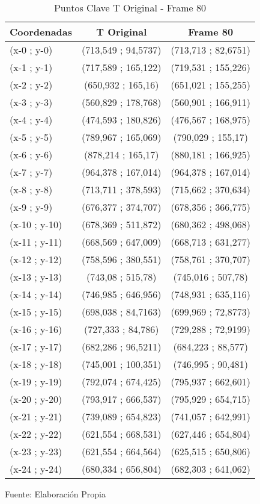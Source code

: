 \begin{table}[htbp]
	\centering
	\begin{tabular}{|l|c|c|}
		\hline
		Coordenadas & T Original & Frame 80\\ \hline 
		(x-0 ; y-0) & (713,549 ; 94,5737) & (713,713 ; 82,6751) \\
		(x-1 ; y-1) & (717,589 ; 165,122) & (719,531 ; 155,226) \\
		(x-2 ; y-2) & (650,932 ; 165,16) & (651,021 ; 155,255) \\
		(x-3 ; y-3) & (560,829 ; 178,768) & (560,901 ; 166,911) \\
		(x-4 ; y-4) & (474,593 ; 180,826) & (476,567 ; 168,975) \\
		(x-5 ; y-5) & (789,967 ; 165,069) & (790,029 ; 155,17) \\
		(x-6 ; y-6) & (878,214 ; 165,17) & (880,181 ; 166,925) \\
		(x-7 ; y-7) & (964,378 ; 167,014) & (964,378 ; 167,014) \\
		(x-8 ; y-8) & (713,711 ; 378,593) & (715,662 ; 370,634) \\
		(x-9 ; y-9) & (676,377 ; 374,707) & (678,356 ; 366,775) \\
		(x-10 ; y-10) & (678,369 ; 511,872) & (680,362 ; 498,068) \\
		(x-11 ; y-11) & (668,569 ; 647,009) & (668,713 ; 631,277) \\
		(x-12 ; y-12) & (758,596 ; 380,551) & (758,761 ; 370,707) \\
		(x-13 ; y-13) & (743,08 ; 515,78) & (745,016 ; 507,78) \\
		(x-14 ; y-14) & (746,985 ; 646,956) & (748,931 ; 635,116) \\
		(x-15 ; y-15) & (698,038 ; 84,7163) & (699,969 ; 72,8773) \\
		(x-16 ; y-16) & (727,333 ; 84,786) & (729,288 ; 72,9199) \\
		(x-17 ; y-17) & (682,286 ; 96,5211) & (684,223 ; 88,577) \\
		(x-18 ; y-18) & (745,001 ; 100,351) & (746,995 ; 90,481) \\
		(x-19 ; y-19) & (792,074 ; 674,425) & (795,937 ; 662,601) \\
		(x-20 ; y-20) & (793,917 ; 666,537) & (795,929 ; 654,715) \\
		(x-21 ; y-21) & (739,089 ; 654,823) & (741,057 ; 642,991) \\
		(x-22 ; y-22) & (621,554 ; 668,531) & (627,446 ; 654,804) \\
		(x-23 ; y-23) & (621,554 ; 664,564) & (625,515 ; 650,806) \\
		(x-24 ; y-24) & (680,334 ; 656,804) & (682,303 ; 641,062) \\ \hline 
	\end{tabular}%
	\caption{Puntos Clave T Original -  Frame 80}
	\footnotesize Fuente: Elaboración Propia
	\label{checkeroriginalpart1}
\end{table}%


